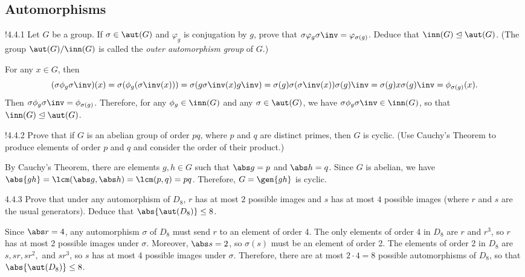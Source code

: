 \subsection{Automorphisms}

\begin{exercise}!{4.4.1}
	Let $G$ be a group.
	If $\sigma \in \aut(G)$ and $\varphi_g$ is conjugation by $g$, prove that $\sigma \varphi_g \sigma\inv = \varphi_{\sigma(g)}$.
	Deduce that $\inn(G) \trianglelefteq \aut(G)$. (The group $\aut(G)/\inn(G)$ is called the \emph{outer automorphism group} of $G$.)
\end{exercise}

\begin{sol}
	For any $x \in G$, then
	\[
		(\sigma\phi_g\sigma\inv)(x) = \sigma(\phi_g(\sigma\inv(x))) = \sigma(g\sigma\inv(x)g\inv) = \sigma(g)\sigma(\sigma\inv(x))\sigma(g)\inv = \sigma(g)x\sigma(g)\inv = \phi_{\sigma(g)}(x).
	\]
	Then $\sigma\phi_g\sigma\inv = \phi_{\sigma(g)}$.
	Therefore, for any $\phi_g \in \inn(G)$ and any $\sigma \in \aut(G)$, we have $\sigma\phi_g\sigma\inv \in \inn(G)$, so that $\inn(G) \trianglelefteq \aut(G)$.
\end{sol}

\begin{exercise}!{4.4.2}
	Prove that if $G$ is an abelian group of order $pq$, where $p$ and $q$ are distinct primes, then $G$ is cyclic. (Use Cauchy's Theorem to produce elements of order $p$ and $q$ and consider the order of their product.)
\end{exercise}

\begin{sol}
	By Cauchy's Theorem, there are elements $g, h \in G$ such that $\abs g = p$ and $\abs h = q$.
	Since $G$ is abelian, we have $\abs{gh} = \lcm(\abs g, \abs h) = \lcm(p, q) = pq$.
	Therefore, $G = \gen{gh}$ is cyclic.
\end{sol}

\begin{exercise}{4.4.3}
	Prove that under any automorphism of $D_8$, $r$ has at most $2$ possible images and $s$ has at most $4$ possible images (where $r$ and $s$ are the usual generators).
	Deduce that $\abs{\aut(D_8)} \leq 8$.
\end{exercise}

\begin{sol}
	Since $\abs r = 4$, any automorphism $\sigma$ of $D_8$ must send $r$ to an element of order 4.
	The only elements of order 4 in $D_8$ are $r$ and $r^3$, so $r$ has at most 2 possible images under $\sigma$.
	Moreover, $\abs s = 2$, so $\sigma(s)$ must be an element of order 2.
	The elements of order 2 in $D_8$ are $s, sr, sr^2,$ and $sr^3$, so $s$ has at most 4 possible images under $\sigma$.
	Therefore, there are at most $2 \cdot 4 = 8$ possible automorphisms of $D_8$, so that $\abs{\aut(D_8)} \leq 8$.
\end{sol}

